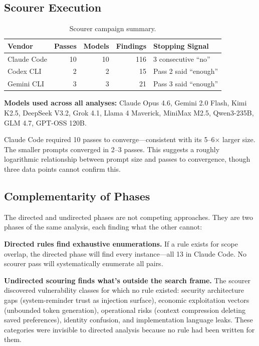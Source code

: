 \documentclass[11pt,a4paper]{article}
\begin{document}
\subsection{Scourer Execution}
\label{sec:scourer-execution}

\begin{table}[H]
\centering
\caption{Scourer campaign summary.}
\label{tab:scourer-summary}
\begin{tabular}{@{}lrrrl@{}}
\toprule
Vendor & Passes & Models & Findings & Stopping Signal \\
\midrule
Claude Code & 10 & 10 & 116 & 3 consecutive ``no'' \\
Codex CLI & 2 & 2 & 15 & Pass 2 said ``enough'' \\
Gemini CLI & 3 & 3 & 21 & Pass 3 said ``enough'' \\
\bottomrule
\end{tabular}
\end{table}

\textbf{Models used across all analyses:} Claude Opus 4.6, Gemini 2.0
Flash, Kimi K2.5, DeepSeek V3.2, Grok 4.1, Llama 4 Maverick, MiniMax
M2.5, Qwen3-235B, GLM 4.7, GPT-OSS 120B.

Claude Code required 10 passes to converge---consistent with its
5--6$\times$ larger size. The smaller prompts converged in 2--3 passes.
This suggests a roughly logarithmic relationship between prompt size
and passes to convergence, though three data points cannot confirm
this.


\subsection{Complementarity of Phases}
\label{sec:complementarity}

The directed and undirected phases are not competing approaches. They
are two phases of the same analysis, each finding what the other
cannot:

\textbf{Directed rules find exhaustive enumerations.} If a rule exists
for scope overlap, the directed phase will find every instance---all 13
in Claude Code. No scourer pass will systematically enumerate all
pairs.

\textbf{Undirected scouring finds what's outside the search frame.}
The scourer discovered vulnerability classes for which no rule existed:
security architecture gaps (system-reminder trust as injection
surface), economic exploitation vectors (unbounded token generation),
operational risks (context compression deleting saved preferences),
identity confusion, and implementation language leaks. These categories
were invisible to directed analysis because no rule had been written
for them.
\end{document}
